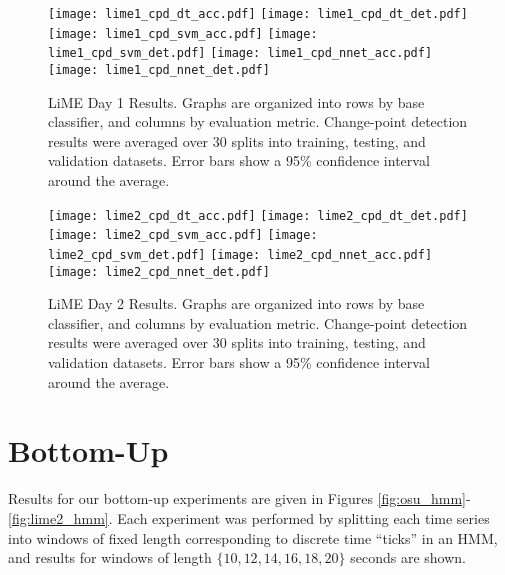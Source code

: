 \begin{figure}[H]
 \centering
 \texttt{[image: lime1\_cpd\_dt\_acc.pdf]} \hspace{1em}\vspace{1em}
 \texttt{[image: lime1\_cpd\_dt\_det.pdf]}
 \texttt{[image: lime1\_cpd\_svm\_acc.pdf]} \hspace{1em}\vspace{1em}
 \texttt{[image: lime1\_cpd\_svm\_det.pdf]}
 \texttt{[image: lime1\_cpd\_nnet\_acc.pdf]} \hspace{1em}
 \texttt{[image: lime1\_cpd\_nnet\_det.pdf]}
 \caption{LiME Day 1 Results. Graphs are organized into rows by base classifier,
  and columns by evaluation metric. Change-point detection results were averaged over
  30 splits into training, testing, and validation datasets. Error bars show a
  95\% confidence interval around the average.}
 \label{fig:lime1_cpd}
\end{figure}

\begin{figure}[H]
 \centering
 \texttt{[image: lime2\_cpd\_dt\_acc.pdf]} \hspace{1em}\vspace{1em}
 \texttt{[image: lime2\_cpd\_dt\_det.pdf]}
 \texttt{[image: lime2\_cpd\_svm\_acc.pdf]} \hspace{1em}\vspace{1em}
 \texttt{[image: lime2\_cpd\_svm\_det.pdf]}
 \texttt{[image: lime2\_cpd\_nnet\_acc.pdf]} \hspace{1em}
 \texttt{[image: lime2\_cpd\_nnet\_det.pdf]}
 \caption{LiME Day 2 Results. Graphs are organized into rows by base classifier,
  and columns by evaluation metric. Change-point detection results were averaged over
  30 splits into training, testing, and validation datasets. Error bars show a
  95\% confidence interval around the average.}
 \label{fig:lime2_cpd}
\end{figure}


\section{Bottom-Up}

Results for our bottom-up experiments are given in
Figures \ref{fig:osu_hmm}-\ref{fig:lime2_hmm}. Each experiment was
performed by splitting each time series into windows of fixed length
corresponding to discrete time ``ticks'' in an HMM,
and results for windows of length $\{10, 12, 14, 16, 18, 20\}$
seconds are shown.

